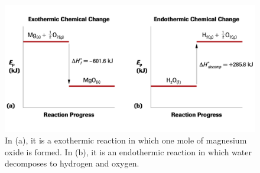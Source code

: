 \begin{figure}[ht!]
    \centering
    \includegraphics[width=0.8 \textwidth]{../figures/potential-energy-diagrams-2.png}
    \caption{In (a), it is a exothermic reaction in which one mole of magnesium oxide is formed. 
        In (b), it is an endothermic reaction in which water decomposes to hydrogen and oxygen.}
\end{figure}


